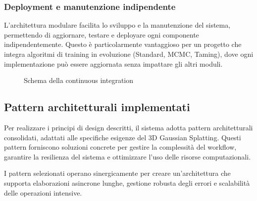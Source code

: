 \subsubsection{Deployment e manutenzione indipendente}
L'architettura modulare facilita lo sviluppo e la manutenzione del sistema, permettendo di aggiornare, testare e deployare ogni componente indipendentemente. Questo è particolarmente vantaggioso per un progetto che integra algoritmi di training in evoluzione (Standard, MCMC, Taming), dove ogni implementazione può essere aggiornata senza impattare gli altri moduli.

\begin{figure}[htbp]
	\centering
	\caption{Schema della continuous integration}
	\label{fig:continuous_integration}
\end{figure}

\subsection{Pattern architetturali implementati}

Per realizzare i principi di design descritti, il sistema adotta pattern architetturali consolidati, adattati alle specifiche esigenze del 3D Gaussian Splatting. Questi pattern forniscono soluzioni concrete per gestire la complessità del workflow, garantire la resilienza del sistema e ottimizzare l'uso delle risorse computazionali.

I pattern selezionati operano sinergicamente per creare un'architettura che supporta elaborazioni asincrone lunghe, gestione robusta degli errori e scalabilità delle operazioni intensive.

